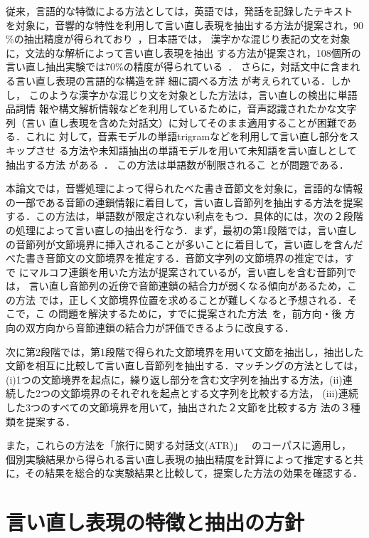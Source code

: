 従来，言語的な特徴による方法としては，英語では，発話を記録したテキスト
を対象に，音響的な特性を利用して言い直し表現を抽出する方法が提案され，90
\%の抽出精度が得られており~\cite{shriberg:92:a,nakatani:94:a}，日本語では，
漢字かな混じり表記の文を対象に，文法的な解析によって言い直し表現を抽出
する方法が提案され，108個所の言い直し抽出実験では70\%の精度が得られている~\cite{sagawa:94:a}．
さらに，対話文中に含まれる言い直し表現の言語的な構造を詳
細に調べる方法\cite{nakano:97:a,den:97:a}
が考えられている．しかし，
このような漢字かな混じり文を対象とした方法は，言い直しの検出に単語品詞情
報や構文解析情報などを利用しているために，音声認識されたかな文字列（言い
直し表現を含めた対話文）に対してそのまま適用することが困難である．これに
対して，音素モデルの単語trigramなどを利用して言い直し部分をスキップさせ
る方法や未知語抽出の単語モデルを用いて未知語を言い直しとして抽出する方法
がある~\cite{wilpon:90:a,asadi:91:a,murakami:95:a}．
この方法は単語数が制限されるこ
とが問題である．

本論文では，音響処理によって得られたべた書き音節文を対象に，言語的な情報
の一部である音節の連鎖情報に着目して，言い直し音節列を抽出する方法を提案
する．この方法は，単語数が限定されない利点をもつ．具体的には，次の２段階
の処理によって言い直しの抽出を行なう．まず，最初の第1段階では，言い直し
の音節列が文節境界に挿入されることが多いことに着目して，言い直しを含んだ
べた書き音節文の文節境界を推定する．音節文字列の文節境界の推定では，すで
にマルコフ連鎖を用いた方法が提案されているが，言い直しを含む音節列では，
言い直し音節列の近傍で音節連鎖の結合力が弱くなる傾向があるため，この方法
では，正しく文節境界位置を求めることが難しくなると予想される．そこで，こ
の問題を解決するために，すでに提案された方法~\cite{araki:97:a}を，前方向・後
方向の双方向から音節連鎖の結合力が評価できるように改良する．

次に第2段階では，第1段階で得られた文節境界を用いて文節を抽出し，抽出した
文節を相互に比較して言い直し音節列を抽出する．マッチングの方法としては，
(i)1つの文節境界を起点に，繰り返し部分を含む文字列を抽出する方法，(ii)連
続した2つの文節境界のそれぞれを起点とする文字列を比較する方法，
(iii)連続した3つのすべての文節境界を用いて，抽出された２文節を比較する方
法の３種類を提案する．

また，これらの方法を「旅行に関する対話文(ATR)」~\cite{ehara:90:a}
のコーパスに適用し，
個別実験結果から得られる言い直し表現の抽出精度を計算によって推定すると共
に，その結果を総合的な実験結果と比較して，提案した方法の効果を確認する．
\section{言い直し表現の特徴と抽出の方針}
